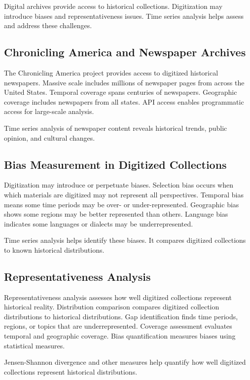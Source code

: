 Digital archives provide access to historical collections. Digitization may introduce biases and representativeness issues. Time series analysis helps assess and address these challenges.

\subsection{Chronicling America and Newspaper Archives}

The Chronicling America project provides access to digitized historical newspapers. Massive scale includes millions of newspaper pages from across the United States. Temporal coverage spans centuries of newspapers. Geographic coverage includes newspapers from all states. API access enables programmatic access for large-scale analysis.

Time series analysis of newspaper content reveals historical trends, public opinion, and cultural changes.

\subsection{Bias Measurement in Digitized Collections}

Digitization may introduce or perpetuate biases. Selection bias occurs when which materials are digitized may not represent all perspectives. Temporal bias means some time periods may be over- or under-represented. Geographic bias shows some regions may be better represented than others. Language bias indicates some languages or dialects may be underrepresented.

Time series analysis helps identify these biases. It compares digitized collections to known historical distributions.

\subsection{Representativeness Analysis}

Representativeness analysis assesses how well digitized collections represent historical reality. Distribution comparison compares digitized collection distributions to historical distributions. Gap identification finds time periods, regions, or topics that are underrepresented. Coverage assessment evaluates temporal and geographic coverage. Bias quantification measures biases using statistical measures.

Jensen-Shannon divergence and other measures help quantify how well digitized collections represent historical distributions.

